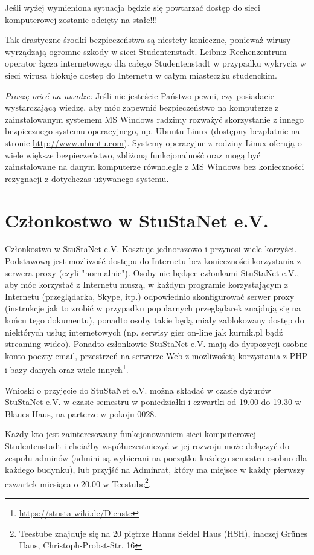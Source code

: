 \documentclass[a4paper,12pt]{scrartcl}
\begin{document}
\begin{em}
Jeśli wyżej wymieniona sytuacja będzie się powtarzać dostęp do sieci komputerowej zostanie odcięty na stałe!!!
\end{em}

Tak drastyczne środki bezpieczeństwa są niestety konieczne, ponieważ wirusy wyrządzają ogromne szkody w sieci Studentenstadt. Leibniz-Rechenzentrum – operator łącza internetowego dla całego Studentenstadt w przypadku wykrycia w sieci wirusa blokuje dostęp do Internetu w całym miasteczku studenckim. 

\emph{Proszę mieć na uwadze:} Jeśli nie jesteście Państwo pewni, czy posiadacie wystarczającą wiedzę, aby móc zapewnić bezpieczeństwo na komputerze z zainstalowanym systemem MS Windows radzimy rozważyć skorzystanie z innego bezpiecznego systemu operacyjnego, np. Ubuntu Linux (dostępny bezpłatnie na stronie \url{http://www.ubuntu.com}). Systemy operacyjne z rodziny Linux oferują o wiele większe bezpieczeństwo, zbliżoną funkcjonalność oraz mogą być zainstalowane na danym komputerze równolegle z MS Windows bez konieczności rezygnacji z dotychczas używanego systemu.

\section*{Członkostwo w StuStaNet e.V.}

Członkostwo w StuStaNet e.V. Kosztuje jednorazowo  i przynosi wiele korzyści. Podstawową jest możliwość dostępu do Internetu bez konieczności korzystania z serwera proxy (czyli "normalnie").  Osoby nie będące członkami StuStaNet e.V., aby móc korzystać z Internetu muszą, w każdym programie korzystającym z Internetu (przeglądarka, Skype, itp.) odpowiednio skonfigurować serwer proxy (instrukcje jak to zrobić w przypadku popularnych przeglądarek znajdują się na końcu tego dokumentu), ponadto osoby takie będą miały zablokowany dostęp do niektórych usług internetowych (np. serwisy gier on-line jak kurnik.pl bądź streaming wideo). Ponadto członkowie StuStaNet e.V. mają do dyspozycji osobne konto poczty email, przestrzeń na serwerze Web z możliwością korzystania z PHP i bazy danych oraz wiele innych\footnote{\url{https://stusta-wiki.de/Dienste}}.

Wnioski o przyjęcie do StuStaNet e.V. można składać w czasie dyżurów StuStaNet e.V. w czasie semestru w poniedziałki i czwartki od 19.00 do 19.30 w Blaues Haus, na parterze w pokoju 0028.

Każdy kto jest zainteresowany funkcjonowaniem sieci komputerowej Studentenstadt i chciałby współuczestniczyć w jej rozwoju może dołączyć do zespołu adminów (admini są wybierani na początku każdego semestru osobno dla każdego budynku), lub przyjść na Adminrat, który ma miejsce w każdy pierwszy czwartek miesiąca o 20.00 w Teestube\footnote{Teestube znajduje się na 20 piętrze Hanns Seidel Haus (HSH), inaczej Grünes Haus, Christoph-Probst-Str. 16}.
\end{document}
